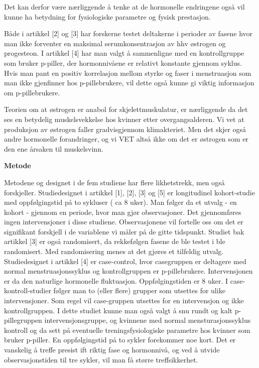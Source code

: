 \documentclass[
  letterpaper,
  DIV=11,
  numbers=noendperiod]{scrreprt}
\begin{document}
Det kan derfor være nærliggende å tenke at de hormonelle endringene også
vil kunne ha betydning for fysiologiske parametre og fysisk prestasjon.

Både i artikkel {[}2{]} og {[}3{]} har forskerne testet deltakerne i
perioder av fasene hvor man ikke forventer en maksimal
serumkonsentrasjon av hhv østrogen og progesteon. I artikkel {[}4{]} har
man valgt å sammenligne med en kontrollgruppe som bruker p-piller, der
hormonnivåene er relativt konstante gjennom syklus. Hvis man pant en
positiv korrelasjon mellom styrke og faser i menstruasjon som man ikke
gjenfinner hos p-pillebrukere, vil dette også kunne gi viktig
informasjon om p-pillebrukere.

Teorien om at østrogen er anabol for skjelettmuskulatur, er nærliggende
da det ses en betydelig muskelsvekkelse hos kvinner etter
overgangsalderen. Vi vet at produksjon av østrogen faller gradvisgjennom
klimakteriet. Men det skjer også andre hormonelle forandringer, og vi
VET altså ikke om det er østrogen som er den ene årsaken til
muskelsvinn.

\textbf{Metode}

Metodene og designet i de fem studiene har flere likhetstrekk, men også
forskjeller. Studiedesignet i artikkel {[}1{]}, {[}2{]}, {[}3{]} og
{[}5{]} er longitudinel kohort-studie med oppfølgingstid på to sykluser
( ca 8 uker). Man følger da et utvalg - en kohort - gjennom en periode,
hvor man gjør observasjoner. Det gjennomføres ingen intervensjoner i
disse studiene. Observasjonene vil fortelle oss om det er signifikant
forskjell i de variablene vi måler på de gitte tidspunkt. Studiet bak
artikkel {[}3{]} er også randomisert, da rekkefølgen fasene de ble
testet i ble randomisert. Med randomisering menes at det gjøres et
tilfeldig utvalg. Studiedesignet i artikkel {[}4{]} er case-control,
hvor casegruppen er deltagere med normal menstruasjonssyklus og
kontrollgruppen er p-pillebrukere. Intervensjonen er da den naturlige
hormonelle fluktuasjon. Oppfølgingstiden er 8 uker. I
case-kontroll-studier følger man to (eller flere) grupper som utsettes
for ulike intervensjoner. Som regel vil case-gruppen utsettes for en
intervensjon og ikke kontrollgruppen. I dette studiet kunne man også
valgt å snu rundt og kalt p-pillegruppen intervensjonsgruppe, og
kvinnene med normal mensturasjonssyklus kontroll og da sett på
eventuelle treningsfysiologiske parametre hos kvinner som bruker
p-piller. En oppfølgingstid på to sykler forekommer noe kort. Det er
vanskelig å treffe presist ift riktig fase og hormonnivå, og ved å
utvide observasjonstiden til tre sykler, vil man få større
treffsikkerhet.
\end{document}
